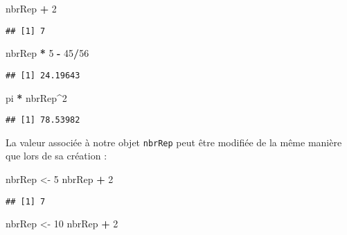 \documentclass[]{book}
\newenvironment{Shaded}{\begin{snugshade}}{\end{snugshade}}
\newcommand{\DecValTok}[1]{\textcolor[rgb]{0.00,0.00,0.81}{#1}}
\newcommand{\StringTok}[1]{\textcolor[rgb]{0.31,0.60,0.02}{#1}}
\newcommand{\OperatorTok}[1]{\textcolor[rgb]{0.81,0.36,0.00}{\textbf{#1}}}
\newcommand{\NormalTok}[1]{#1}
\theoremstyle{definition}
\theoremstyle{definition}
\theoremstyle{definition}
\theoremstyle{remark}
\begin{document}
\begin{Shaded}
\begin{Highlighting}[]
\NormalTok{nbrRep }\OperatorTok{+}\StringTok{ }\DecValTok{2}
\end{Highlighting}
\end{Shaded}

\begin{verbatim}
## [1] 7
\end{verbatim}

\begin{Shaded}
\begin{Highlighting}[]
\NormalTok{nbrRep }\OperatorTok{*}\StringTok{ }\DecValTok{5} \OperatorTok{-}\StringTok{ }\DecValTok{45}\OperatorTok{/}\DecValTok{56}
\end{Highlighting}
\end{Shaded}

\begin{verbatim}
## [1] 24.19643
\end{verbatim}

\begin{Shaded}
\begin{Highlighting}[]
\NormalTok{pi }\OperatorTok{*}\StringTok{ }\NormalTok{nbrRep}\OperatorTok{^}\DecValTok{2}
\end{Highlighting}
\end{Shaded}

\begin{verbatim}
## [1] 78.53982
\end{verbatim}

La valeur associée à notre objet \texttt{nbrRep} peut être modifiée de
la même manière que lors de sa création :

\begin{Shaded}
\begin{Highlighting}[]
\NormalTok{nbrRep <-}\StringTok{ }\DecValTok{5}
\NormalTok{nbrRep }\OperatorTok{+}\StringTok{ }\DecValTok{2}
\end{Highlighting}
\end{Shaded}

\begin{verbatim}
## [1] 7
\end{verbatim}

\begin{Shaded}
\begin{Highlighting}[]
\NormalTok{nbrRep <-}\StringTok{ }\DecValTok{10}
\NormalTok{nbrRep }\OperatorTok{+}\StringTok{ }\DecValTok{2}
\end{Highlighting}
\end{Shaded}
\end{document}
